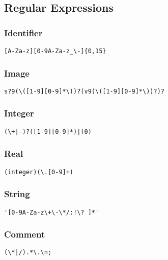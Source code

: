 \subsection{Regular Expressions}

\subsubsection{Identifier}

\begin{verbatim}
[A-Za-z][0-9A-Za-z_\-]{0,15}
\end{verbatim}


\subsubsection{Image}

\begin{verbatim}
s?9(\([1-9][0-9]*\))?(v9(\([1-9][0-9]*\))?)?
\end{verbatim}


\subsubsection{Integer}

\begin{verbatim}
(\+|-)?([1-9][0-9]*)|(0)
\end{verbatim}


\subsubsection{Real}

\begin{verbatim}
(integer)(\.[0-9]+)
\end{verbatim}


\subsubsection{String}

\begin{verbatim}
'[0-9A-Za-z\+\-\*/:!\? ]*'
\end{verbatim}


\subsubsection{Comment}

\begin{verbatim}
(\*|/).*\.\n;
\end{verbatim}
